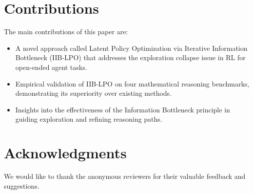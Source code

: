\documentclass{article}
\begin{document}
\section{Contributions}
The main contributions of this paper are:
\begin{itemize}
    \item A novel approach called Latent Policy Optimization via Iterative Information Bottleneck (IIB-LPO) that addresses the exploration collapse issue in RL for open-ended agent tasks.
    \item Empirical validation of IIB-LPO on four mathematical reasoning benchmarks, demonstrating its superiority over existing methods.
    \item Insights into the effectiveness of the Information Bottleneck principle in guiding exploration and refining reasoning paths.
\end{itemize}

\section*{Acknowledgments}
We would like to thank the anonymous reviewers for their valuable feedback and suggestions.



\end{document}
